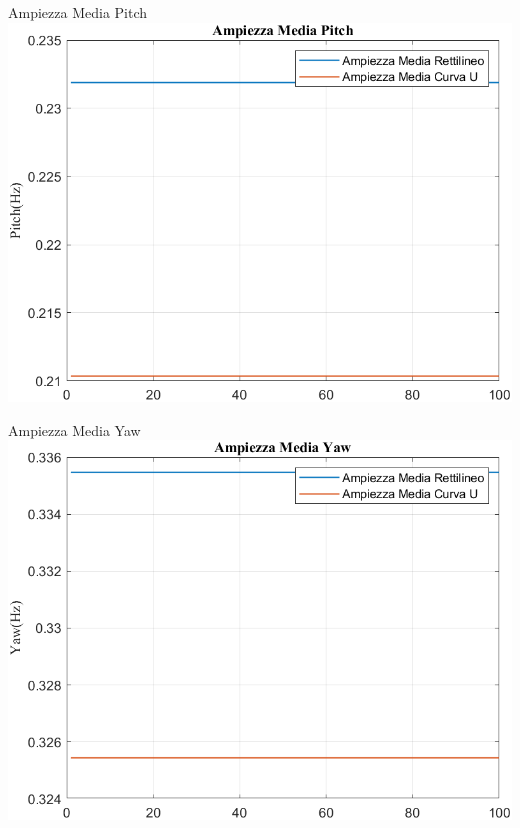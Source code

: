 \documentclass[beamer]{standalone}
\begin{document}
	\begin{frame}{{Ampiezza Media Pitch}}					
		\centering\includegraphics[height=.8\textheight]{figure/VAng/Trasformata/Ampiezza MediaPitch}
	\end{frame}
	
	\begin{frame}{{Ampiezza Media Yaw}}					
		\centering\includegraphics[height=.8\textheight]{figure/VAng/Trasformata/Ampiezza MediaYaw}
	\end{frame}
	
\end{document}
